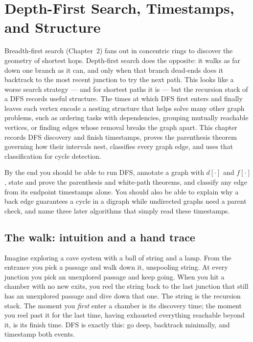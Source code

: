 \chapter{Depth-First Search, Timestamps, and Structure}

\chapterline

Breadth-first search (Chapter~2) fans out in concentric rings to discover
the geometry of shortest hops. Depth-first search does the opposite: it
walks as far down one branch as it can, and only when that branch dead-ends does it
backtrack to the most recent junction to try the next path. This looks like
a worse search strategy --- and for shortest paths it is --- but the recursion stack of
a DFS records useful structure. The times at which DFS first enters and finally
leaves each vertex encode a nesting structure that helps solve many other graph problems, such as ordering tasks with dependencies, grouping mutually reachable vertices, or finding edges whose removal breaks the graph apart. This chapter records DFS
discovery and finish timestamps, proves the parenthesis theorem governing how their
intervals nest, classifies every graph edge, and uses that classification for cycle detection.

\begin{focusbox}
By the end you should be able to run DFS, annotate a graph with $d[\cdot]$ and $f[\cdot]$, state and prove the parenthesis and white-path theorems, and classify any edge from its endpoint timestamps alone. You should also be able to explain why a back edge guarantees a cycle in a digraph while undirected graphs need a parent check, and name three later algorithms that simply read these timestamps.
\end{focusbox}

\section{The walk: intuition and a hand trace}
\label{ch03:intuition}

\begin{intuitionbox}
Imagine exploring a cave system with a ball of string and a lamp. From the entrance you pick a passage and walk down it, unspooling string. At every junction you pick an unexplored passage and keep going. When you hit a chamber with no new exits, you reel the string back to the last junction that still has an unexplored passage and dive down that one. The string is the recursion stack. The moment you \emph{first} enter a chamber is its discovery time; the moment you reel past it for the last time, having exhausted everything reachable beyond it, is its finish time. DFS is exactly this: go deep, backtrack minimally, and timestamp both events.
\end{intuitionbox}

